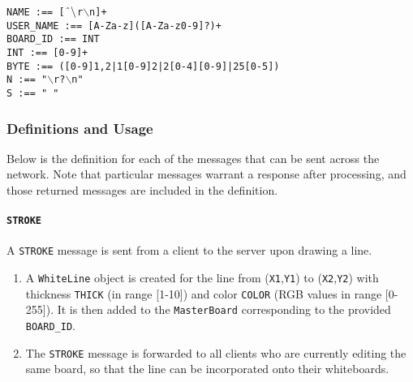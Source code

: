 \texttt{NAME :== [$\char`\^ \backslash$r$\backslash$n]+}\\
\texttt{USER\_NAME :== [A-Za-z]([A-Za-z0-9]?)+}\\
\texttt{BOARD\_ID :== INT}\\

\texttt{INT :== [0-9]+}\\
\texttt{BYTE :== ([0-9]{1,2}|1[0-9]{2}|2[0-4][0-9]|25[0-5])}\\ %
\texttt{N :== "$\backslash$r?$\backslash$n"}\\
\texttt{S :== " "}\\

\setlength{\parindent}{15pt} %

\subsubsection{Definitions and Usage}
Below is the definition for each of the messages that can be sent across the network. Note that particular messages warrant a response after processing, and those returned messages are included in the definition.

\paragraph{\texttt{STROKE}} A \texttt{STROKE} message is sent from a client to the server upon drawing a line.
\begin{enumerate}
\item A \texttt{WhiteLine} object is created for the line from (\texttt{X1},\texttt{Y1}) to (\texttt{X2},\texttt{Y2}) with thickness \texttt{THICK} (in range [1-10]) and color \texttt{COLOR} (RGB values in range [0-255]). It is then added to the \texttt{MasterBoard} corresponding to the provided \texttt{BOARD\_ID}.
\item The \texttt{STROKE} message is forwarded to all clients who are currently editing the same board, so that the line can be incorporated onto their whiteboards.
\end{enumerate}

